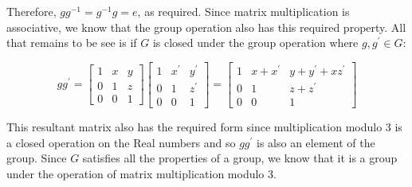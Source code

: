 \documentclass[12pt,letterpaper,reqno]{amsart}
\begin{document}
\begin{enumerate}
\begin{flushleft}
Therefore, $gg^{-1} = g^{-1}g = e$, as required. Since matrix multiplication is associative, we know that the group operation also has this required property. All that remains to be see is if $G$ is closed under the group operation where $g, g^\prime \in G$:
\newline

$$gg^\prime = \begin{bmatrix} 1 & x & y \\0 & 1 & z\\ 0 & 0 & 1 \end{bmatrix}\begin{bmatrix} 1 & x^\prime & y^\prime \\0 & 1 & z^\prime\\ 0 & 0 & 1 \end{bmatrix} = \begin{bmatrix} 1 & x+x^\prime & y+y^\prime+xz^\prime \\0 & 1 & z+z^\prime\\ 0 & 0 & 1 \end{bmatrix}$$
\newline

This resultant matrix also has the required form since multiplication modulo 3 is a closed operation on the Real numbers and so $gg^\prime$ is also an element of the group. Since $G$ satisfies all the properties of a group, we know that it is a group under the operation of matrix multiplication modulo 3.
\newline


\end{flushleft}
\end{enumerate}
\end{document}
